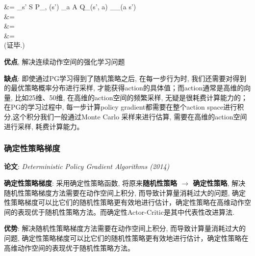 \documentclass{article}
\begin{document}
{                &= \alpha \sum\limits_{s' \in S} \mathbb P_{\mu, \pi}(s') \sum_{a \in A} Q_{\pi}(s', a) \nabla_\theta {}_\pi (a \mid s')  \\
                &= \alpha {}  \\
                &= \alpha {}  \\
                &= \alpha {}  \\
            }
            (证毕.)
            
        \textbf{优点}, 解决连续动作空间的强化学习问题
        
        \textbf{缺点}:
            即使通过PG学习得到了随机策略之后, 在每一步行为时, 我们还需要对得到的最优策略概率分布进行采样, 才能获得action的具体值；而action通常是高维的向量, 比如25维、50维, 在高维的action空间的频繁采样, 无疑是很耗费计算能力的； 在PG的学习过程中, 每一步计算policy gradient都需要在整个action space进行积分,这个积分我们一般通过Monte Carlo 采样来进行估算, 需要在高维的action空间进行采样, 耗费计算能力。

            
    \subsubsection{确定性策略梯度} 
        \textbf{论文}: \textit{Deterministic Policy Gradient Algorithms (2014)}

        \textbf{确定性策略梯度}: 采用确定性策略函数, 将原来\textbf{随机性策略 $\to$ 确定性策略}, 解决随机性策略梯度方法需要在动作空间上积分, 而导致计算量消耗过大的问题, 确定性策略梯度可以比它们的随机性策略更有效地进行估计，确定性策略在高维动作空间的表现优于随机性策略方法。而确定性Actor-Critic是其中代表性改进算法.

        \textbf{优势}: 解决随机性策略梯度方法需要在动作空间上积分, 而导致计算量消耗过大的问题, 确定性策略梯度可以比它们的随机性策略更有效地进行估计，确定性策略在高维动作空间的表现优于随机性策略方法。
        
\end{document}
